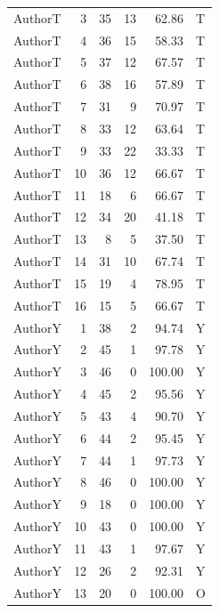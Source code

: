 \begin{longtable}{lrrrrl}
AuthorT & 3 & 35 & 13 & 62.86 & T\\
AuthorT & 4 & 36 & 15 & 58.33 & T\\
AuthorT & 5 & 37 & 12 & 67.57 & T\\
AuthorT & 6 & 38 & 16 & 57.89 & T\\
AuthorT & 7 & 31 & 9 & 70.97 & T\\
AuthorT & 8 & 33 & 12 & 63.64 & T\\
AuthorT & 9 & 33 & 22 & 33.33 & T\\
AuthorT & 10 & 36 & 12 & 66.67 & T\\
AuthorT & 11 & 18 & 6 & 66.67 & T\\
AuthorT & 12 & 34 & 20 & 41.18 & T\\
AuthorT & 13 & 8 & 5 & 37.50 & T\\
AuthorT & 14 & 31 & 10 & 67.74 & T\\
AuthorT & 15 & 19 & 4 & 78.95 & T\\
AuthorT & 16 & 15 & 5 & 66.67 & T\\
AuthorY & 1 & 38 & 2 & 94.74 & Y\\
AuthorY & 2 & 45 & 1 & 97.78 & Y\\
AuthorY & 3 & 46 & 0 & 100.00 & Y\\
AuthorY & 4 & 45 & 2 & 95.56 & Y\\
AuthorY & 5 & 43 & 4 & 90.70 & Y\\
AuthorY & 6 & 44 & 2 & 95.45 & Y\\
AuthorY & 7 & 44 & 1 & 97.73 & Y\\
AuthorY & 8 & 46 & 0 & 100.00 & Y\\
AuthorY & 9 & 18 & 0 & 100.00 & Y\\
AuthorY & 10 & 43 & 0 & 100.00 & Y\\
AuthorY & 11 & 43 & 1 & 97.67 & Y\\
AuthorY & 12 & 26 & 2 & 92.31 & Y\\
AuthorY & 13 & 20 & 0 & 100.00 & O\\
\bottomrule\end{longtable}

